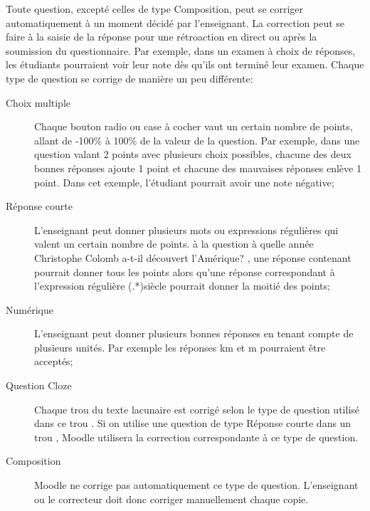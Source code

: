 Toute question, except\'e celles de type Composition, peut se corriger automatiquement \`a un moment d\'ecid\'e par l'enseignant.
La correction peut se faire \`a la saisie de la r\'eponse pour une r\'etroaction en direct ou apr\`es la soumission du questionnaire.
Par exemple, dans un examen \`a choix de r\'eponses, les \'etudiants pourraient voir leur note d\`es qu'ils ont termin\'e leur examen.
Chaque type de question se corrige de mani\`ere un peu diff\'erente:
\begin{description}
  \item[Choix multiple]
  
  Chaque bouton radio ou case \`a cocher vaut un certain nombre de points, allant de -100\% \`a 100\% de la valeur de la question.
  Par exemple, dans une question valant 2 points avec plusieurs choix possibles, chacune des deux bonnes r\'eponses ajoute 1 point et chacune des mauvaises r\'eponses enl\`eve 1 point.
  Dans cet exemple, l'\'etudiant pourrait avoir une note n\'egative;
  
  \item[R\'eponse courte]
  
  L'enseignant peut donner plusieurs mots ou expressions r\'eguli\`eres qui valent un certain nombre de points.
  \`a la question \og{} \`a quelle ann\'ee Christophe Colomb a-t-il d\'ecouvert l'Am\'erique? \fg{}, une r\'eponse contenant  \fg{} pourrait donner tous les points alors qu'une r\'eponse correspondant \`a l'expression r\'eguli\`ere (.*)si\`ecle \fg{} pourrait donner la moiti\'e des points;
  
  \item[Num\'erique]
  
  L'enseignant peut donner plusieurs bonnes r\'eponses en tenant compte de plusieurs unit\'es.
  Par exemple les r\'eponses  km \fg{} et   m \fg{} pourraient \^etre accept\'es;
  
  \item[Question Cloze]
  
  Chaque \og trou \fg{} du texte lacunaire est corrig\'e selon le type de question utilis\'e dans ce \og trou \fg{}.
  Si on utilise une question de type R\'eponse courte dans un \og trou \fg{}, Moodle utilisera la correction correspondante \`a ce type de question.
  
  \item[Composition]
  
  Moodle ne corrige pas automatiquement ce type de question.
  L'enseignant ou le correcteur doit donc corriger manuellement chaque copie.
\end{description}

